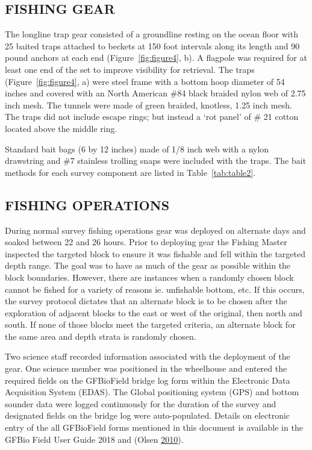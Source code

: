 \documentclass[12pt]{article}\usepackage[]{graphicx}\usepackage[]{color}
\begin{document}
\hypertarget{fishing-gear}{%
\subsection{FISHING GEAR}\label{fishing-gear}}

The longline trap gear consisted of a groundline resting on the ocean floor with 25 baited traps attached to beckets at 150 foot intervals along its length and 90 pound anchors at each end (Figure~\ref{fig:figure4}, b). A flagpole was required for at least one end of the set to improve visibility for retrieval. The traps (Figure~\ref{fig:figure4}, a) were steel frame with a bottom hoop diameter of 54 inches and covered with an North American \#84 black braided nylon web of 2.75 inch mesh. The tunnels were made of green braided, knotless, 1.25 inch mesh. The traps did not include escape rings; but instead a `rot panel' of \# 21 cotton located above the middle ring.

Standard bait bags (6 by 12 inches) made of 1/8 inch web with a nylon drawstring and \#7 stainless trolling snaps were included with the traps. The bait methods for each survey component are listed in Table~\ref{tab:table2}.

\hypertarget{fishing-operations}{%
\subsection{FISHING OPERATIONS}\label{fishing-operations}}

During normal survey fishing operations gear was deployed on alternate days and soaked between 22 and 26 hours. Prior to deploying gear the Fishing Master inspected the targeted block to ensure it was fishable and fell within the targeted depth range. The goal was to have as much of the gear as possible within the block boundaries. However, there are instances when a randomly chosen block cannot be fished for a variety of reasons ie. unfishable bottom, etc. If this occurs, the survey protocol dictates that an alternate block is to be chosen after the exploration of adjacent blocks to the east or west of the original, then north and south. If none of those blocks meet the targeted criteria, an alternate block for the same area and depth strata is randomly chosen.

Two science staff recorded information associated with the deployment of the gear. One science member was positioned in the wheelhouse and entered the required fields on the GFBioField bridge log form within the Electronic Data Acquisition System (EDAS). The Global positioning system (GPS) and bottom sounder data were logged continuously for the duration of the survey and designated fields on the bridge log were auto-populated. Details on electronic entry of the all GFBioField forms mentioned in this document is available in the GFBio Field User Guide 2018 and (Olsen \protect\hyperlink{ref-Olsen2010}{2010}).
\end{document}
